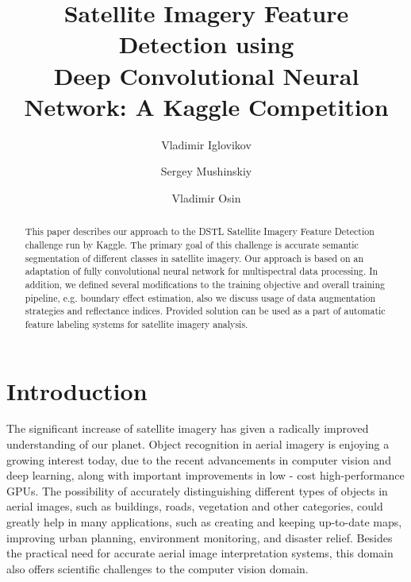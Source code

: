 \documentclass[10pt,twocolumn,letterpaper]{article}
\begin{document}
\title{Satellite Imagery Feature Detection using \\ Deep Convolutional Neural Network: A Kaggle Competition}

\author[1]{Vladimir Iglovikov}
\author[2]{Sergey Mushinskiy}
\author[3]{Vladimir Osin}


\renewcommand\Authands{ and }

\maketitle

\begin{abstract}
This paper describes our approach to the DSTL Satellite Imagery Feature Detection challenge run by Kaggle. The primary goal of this challenge is accurate semantic segmentation of different classes in satellite imagery. Our approach is based on an adaptation of fully convolutional neural network for multispectral data processing.  In addition, we defined several modifications to the training objective and overall training pipeline, e.g. boundary effect estimation, also we discuss usage of data augmentation strategies and reflectance indices. Provided solution can be used as a part of automatic feature labeling systems for satellite imagery analysis.
\end{abstract}

\section{Introduction}
The significant increase of satellite imagery has given a radically improved understanding of our planet. Object recognition in aerial imagery is enjoying a growing interest today, due to the recent advancements in computer vision and deep learning, along with important improvements in low - cost high-performance GPUs. The possibility of accurately distinguishing different types of objects in aerial images, such as buildings, roads, vegetation and other categories, could greatly help in many applications, such as creating and keeping up-to-date maps, improving urban planning, environment monitoring, and disaster relief. Besides the practical need for accurate aerial image interpretation systems, this domain also offers scientific challenges to the computer vision domain.
\end{document}

